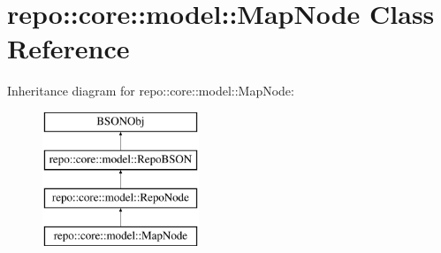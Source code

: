 \hypertarget{classrepo_1_1core_1_1model_1_1_map_node}{}\section{repo\+:\+:core\+:\+:model\+:\+:Map\+Node Class Reference}
\label{classrepo_1_1core_1_1model_1_1_map_node}
Inheritance diagram for repo\+:\+:core\+:\+:model\+:\+:Map\+Node\+:\begin{figure}[H]
\begin{center}
\leavevmode
\includegraphics[height=4.000000cm]{classrepo_1_1core_1_1model_1_1_map_node}
\end{center}
\end{figure}
